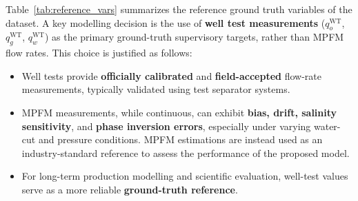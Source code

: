 \documentclass[12pt,APA]{uomthesis}
\begin{document}
\begin{table}[!htb]
\end{table}

\begin{table}[!htb]
\end{table}

Table~\ref{tab:reference_vars} summarizes the reference ground truth variables of the dataset. 
A key modelling decision is the use of \textbf{well test measurements} ($q_o^{\mathrm{WT}}$,
$q_g^{\mathrm{WT}}$, $q_w^{\mathrm{WT}}$) as the primary ground-truth supervisory targets,
rather than MPFM flow rates. This choice is justified as follows:

\begin{itemize}
    \item Well tests provide \textbf{officially calibrated} and \textbf{field-accepted} flow-rate
          measurements, typically validated using test separator systems.
    \item MPFM measurements, while continuous, can exhibit \textbf{bias, drift, salinity sensitivity},
          and \textbf{phase inversion errors}, especially under varying water-cut and pressure conditions.
          MPFM estimations are instead used as an industry-standard reference to assess the performance of the proposed model.
    \item For long-term production modelling and scientific evaluation,
          well-test values serve as a more reliable \textbf{ground-truth reference}.
\end{itemize}
\end{document}
